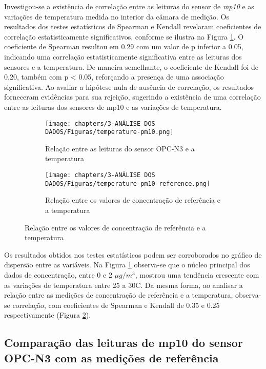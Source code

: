 Investigou-se a existência de correlação entre as leituras do sensor de \textit{mp10} e as variações de temperatura medida no interior da câmara de medição. Os resultados dos testes estatísticos de Spearman e Kendall revelaram coeficientes de correlação estatisticamente significativos, conforme se ilustra na Figura \ref{fig:data-temp-pm10-corr}. O coeficiente de Spearman resultou em 0.29 com um valor de p inferior a 0.05, indicando uma correlação estatisticamente significativa entre as leituras dos sensores e a temperatura. De maneira semelhante, o coeficiente de Kendall foi de 0.20, também com p < 0.05, reforçando a presença de uma associação significativa. Ao avaliar a hipótese nula de ausência de correlação, os resultados forneceram evidências para sua rejeição, sugerindo a existência de uma correlação entre as leituras dos sensores de \acrshort{mp10} e as variações de temperatura.

\begin{figure}[h]
    \centering
    \caption{Relação dos dados de concentração de \acrshort{mp10} com a temperatura}
    \begin{subfigure}{0.54\textwidth}
        \texttt{[image: chapters/3-ANÁLISE DOS DADOS/Figuras/temperature-pm10.png]}
        \caption{Relação entre as leituras do sensor OPC-N3 e a temperatura}
        \label{fig:data-temp-pm10-corr}
    \end{subfigure}
    \hfill
    \begin{subfigure}{0.45\textwidth}
        \texttt{[image: chapters/3-ANÁLISE DOS DADOS/Figuras/temperature-pm10-reference.png]}
        \caption{Relação entre os valores de concentração de referência e a temperatura}
        \label{fig:data-temp-pm10-ref-corr}
    \end{subfigure}
    \hfill
    \label{fig:data-pm10-temp}
\end{figure}

Os resultados obtidos nos testes estatísticos podem ser corroborados no gráfico de dispersão entre as variáveis. Na Figura \ref{fig:data-temp-pm10-corr} observa-se que o núcleo principal dos dados de concentração, entre 0 e 2 \(\mu g/m^3\), mostrou uma tendência crescente com as variações de temperatura entre 25 a 30\textdegree C. Da mesma forma, ao analisar a relação entre as medições de concentração de referência e a temperatura, observa-se correlação, com coeficientes de Spearman e Kendall de 0.35 e 0.25 respectivamente (Figura \ref{fig:data-temp-pm10-ref-corr}).

\subsection{Comparação das leituras de \acrshort{mp10} do sensor OPC-N3 com as medições de referência}

